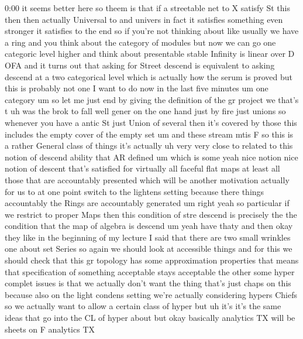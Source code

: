 \begin{unfinished}{0:00}
it  seems  better  here  so  theem  is
that  if  a  streetable
net  to
X  satisfy  St  this
then
then  actually  Universal  to  and
univers  in  fact  it  satisfies  something
even  stronger  it  satisfies
to  the  end  so  if  you're  not  thinking
about  like  usually  we  have  a  ring  and
you  think  about  the  category  of  modules
but  now  we  can  go  one  categoric  level
higher  and  think  about  presentable
stable  Infinity  is  linear  over  D
OFA  and  it  turns  out  that  asking  for
Street  descend  is  equivalent  to  asking
descend  at  a  two  categorical
level  which  is  actually  how  the  serum  is
proved  but  this  is  probably  not  one  I
want  to  do  now  in  the  last  five  minutes
um
one
category
um  so  let  me  just  end  by  giving  the
definition  of  the  gr
project
we  that's
t  uh  was  the  brok  to
fall  well  gener  on  the  one  hand  just  by
fire  just  unions  so  whenever  you  have
a  antic  St  just  Union  of  several  then
it's  covered  by
those  this  includes  the  empty  cover  of
the  empty
set
um  and  these  stream  mtis
F  so  this  is  a  rather  General  class  of
things  it's  actually  uh  very  very  close
to  related  to  this  notion  of  descend
ability  that  AR  defined  um  which  is  some
yeah  nice  notion  nice  notion  of  descent
that's  satisfied  for  virtually  all
faceful  flat  maps  at  least  all  those
that  are  accountably
presented  which  will  be  another
motivation  actually  for  us  to  at  one
point  switch  to  the  lightens  setting
because  there  things  accountably  the
Rings  are  accountably  generated
um
right
yeah  so  particular  if  we  restrict  to
proper  Maps  then  this  condition  of  stre
descend  is  precisely  the  the  condition
that  the  map  of  algebra  is
descend
um  yeah  have  thaty  and  then  okay  they
like  in  the  beginning  of  my  lecture  I
said  that  there  are  two  small  wrinkles
one  about  set  Series  so  again  we  should
look  at  accessible  things  and  for  this
we  should  check  that  this  gr  topology
has  some  approximation  properties  that
means  that  specification  of  something
acceptable  stays  acceptable
the  other  some  hyper  complet  issues  is
that  we  actually  don't  want  the  thing
that's  just  chaps  on  this  because  also
on  the  light  condens  setting  we're
actually  considering  hypers  Chiefs  so  we
actually  want  to  allow  a  certain  class
of  hyper
but  uh  it's  it's  the  same  ideas  that  go
into  the  CL  of  hyper  about  but
okay  basically  analytics  TX  will  be
sheets  on  F  analytics  TX

\end{unfinished}
